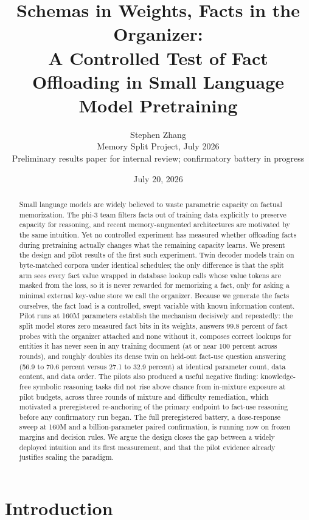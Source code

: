 \documentclass[11pt]{article}
\title{Schemas in Weights, Facts in the Organizer:\\
A Controlled Test of Fact Offloading in Small Language Model Pretraining}
\author{Stephen Zhang\\
\small Memory Split Project, July 2026\\
\small Preliminary results paper for internal review; confirmatory battery in progress}
\date{July 20, 2026}
\begin{document}
\maketitle

\begin{abstract}
Small language models are widely believed to waste parametric capacity on
factual memorization. The phi-3 team filters facts out of training data
explicitly to preserve capacity for reasoning, and recent memory-augmented
architectures are motivated by the same intuition. Yet no controlled
experiment has measured whether offloading facts during pretraining
actually changes what the remaining capacity learns. We present the design
and pilot results of the first such experiment. Twin decoder models train
on byte-matched corpora under identical schedules; the only difference is
that the split arm sees every fact value wrapped in database lookup calls
whose value tokens are masked from the loss, so it is never rewarded for
memorizing a fact, only for asking a minimal external key-value store we
call the organizer. Because we generate the facts ourselves, the fact load
is a controlled, swept variable with known information content. Pilot runs
at 160M parameters establish the mechanism decisively and repeatedly: the
split model stores zero measured fact bits in its weights, answers 99.8
percent of fact probes with the organizer attached and none without it,
composes correct lookups for entities it has never seen in any training
document (at or near 100 percent across rounds), and roughly doubles its
dense twin on held-out fact-use question answering (56.9 to 70.6 percent
versus 27.1 to 32.9 percent) at identical parameter count, data content,
and data order. The pilots also produced a useful negative finding:
knowledge-free symbolic reasoning tasks did not rise above chance from
in-mixture exposure at pilot budgets, across three rounds of mixture and
difficulty remediation, which motivated a preregistered re-anchoring of
the primary endpoint to fact-use reasoning before any confirmatory run
began. The full preregistered battery, a dose-response sweep at 160M and a
billion-parameter paired confirmation, is running now on frozen margins
and decision rules. We argue the design closes the gap between a widely
deployed intuition and its first measurement, and that the pilot evidence
already justifies scaling the paradigm.
\end{abstract}

\section{Introduction}
\end{document}
